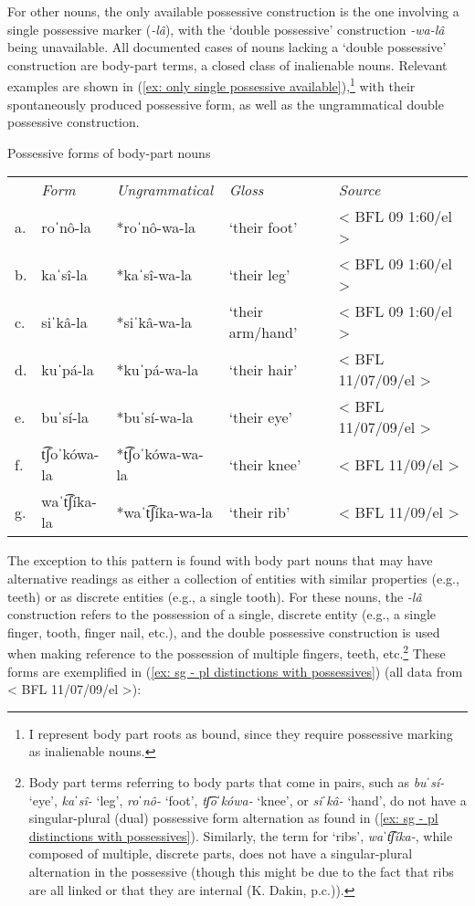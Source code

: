 For other nouns, the only available possessive construction is the one involving a single possessive marker (\textit{-lâ}), with the `double possessive' construction \textit{-wa-lâ} being unavailable. All documented cases of nouns lacking a `double possessive' construction are body-part terms, a closed class of inalienable nouns. Relevant examples are shown in (\ref{ex: only single possessive available}),\footnote{I represent body part roots as bound, since they require possessive marking as inalienable nouns.} with their spontaneously produced possessive form, as well as the ungrammatical double possessive construction.

\ea\label{ex: only single possessive available}
{Possessive forms of body-part nouns}\\
\setlength{\tabcolsep}{3pt}
\begin{tabular}{lllll}
        & \textit{Form} & \textit{Ungrammatical} & \textit{Gloss} & \textit{Source}\\
     a.& roˈnô-la & *roˈnô-wa-la & `their foot' & < BFL 09 1:60/el >\\
     b.& kaˈsî-la  & *kaˈsî-wa-la &   `their leg'& < BFL 09 1:60/el >\\
     c.& siˈkâ-la &  *siˈkâ-wa-la & `their arm\slash hand'  & < BFL 09 1:60/el >\\
     d.& kuˈpá-la & *kuˈpá-wa-la  & `their hair' & < BFL 11/07/09/el >\\
     e.& buˈsí-la & *buˈsí-wa-la  & `their eye' & < BFL 11/07/09/el >\\
     f.& t͡ʃoˈkówa-la & *t͡ʃoˈkówa-wa-la &  `their knee' & < BFL 11/09/el >\\
     g.& waˈt͡ʃíka-la & *waˈt͡ʃíka-wa-la  & `their rib' & < BFL 11/09/el >\\
\end{tabular}
    \z

The exception to this pattern is found with body part nouns that may have alternative readings as either a collection of entities with similar properties (e.g., teeth) or as discrete entities (e.g., a single tooth). For these nouns, the \textit{-lâ} construction refers to the possession of a single, discrete entity (e.g., a single finger, tooth, finger nail, etc.), and the double possessive construction is used when making reference to the possession of multiple fingers, teeth, etc.\footnote{Body part terms referring to body parts that come in pairs, such as \textit{buˈsí-} ‘eye’, \textit{kaˈsî-} ‘leg’, \textit{roˈnô-} ‘foot’, \textit{tʃ͡oˈkówa-} ‘knee’, or \textit{siˈkâ-} ‘hand’, do not have a singular-plural (dual) possessive form alternation as found in (\ref{ex: sg - pl distinctions with possessives}). Similarly, the term for ‘ribs’, \textit{waˈt͡ʃíka-}, while composed of multiple, discrete parts, does not have a singular-plural alternation in the possessive (though this might be due to the fact that ribs are all linked or that they are internal (K. Dakin, p.c.)).}  These forms are exemplified in (\ref{ex: sg - pl distinctions with possessives}) (all data from < BFL 11/07/09/el >):

